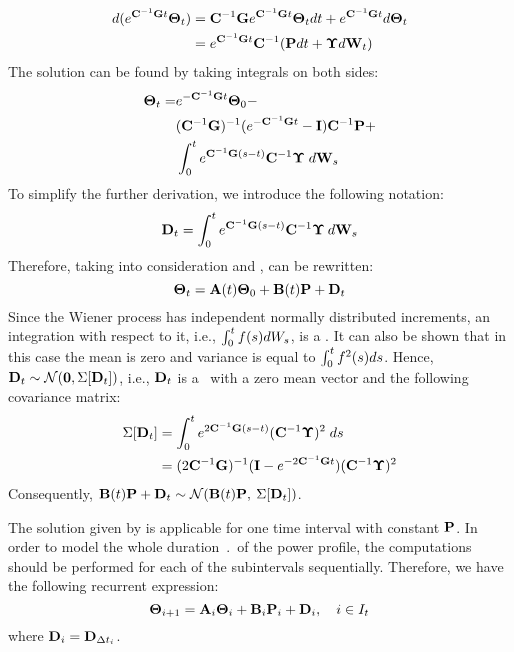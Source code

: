 \begin{align*}
  d(e^{\mathbf{C}^{-1} \mathbf{G} t} \mathbf{\Theta}_t) & = \mathbf{C}^{-1} \mathbf{G} e^{\mathbf{C}^{-1} \mathbf{G} t} \mathbf{\Theta}_t dt + e^{\mathbf{C}^{-1} \mathbf{G} t} d\mathbf{\Theta}_t \\
  & = e^{\mathbf{C}^{-1} \mathbf{G} t} \mathbf{C}^{-1} (\mathbf{P} dt + \mathbf{\Upsilon} d\mathbf{W}_t)
\end{align*}
The solution can be found by taking integrals on both sides:
\begin{align} \equlabel{solution-full}
  \vtemperature_\time = & \emcgt{} \vtemperature_0 - \\
    & (\cg)^{-1}(\emcgt{} - \mone) \mcapacitance^{-1} \vpower + \nonumber \\
    & \int_0^\time \ecg{}{(s - \time)} \mcapacitance^{-1} \mnoisedeviation \; d\m{W}_s \nonumber
\end{align}
To simplify the further derivation, we introduce the following notation:
\[
  \mathbf{D}_t = \int_0^{t} e^{ \mathbf{C}^{-1} \mathbf{G} (s - t)} \mathbf{C}^{-1} \mathbf{\Upsilon} \: d\mathbf{W}_s
\]
Therefore, taking into consideration  and ,  can be rewritten:
\[
  \mathbf{\Theta}_t = \mathbf{A}(t) \mathbf{\Theta}_0 + \mathbf{B}(t) \mathbf{P} + \mathbf{D}_t
\]
Since the Wiener process has independent normally distributed increments, an integration with respect to it, i.e., $\int_0^t f(s) dW_s$, is a \nrv. It can also be shown that in this case the mean is zero and variance is equal to $\int_0^t f^2(s) ds$. Hence, $\mathbf{D}_t \sim \mathcal{N}(\mathbf{0}, \Sigma[\mathbf{D}_t])$, i.e., $\mathbf{D}_t$ is a \mnrv\ with a zero mean vector and the following covariance matrix:
\begin{align}
  \covariance{\v{D}_\time} & = \int_0^\time \ecg{2}{(s - \time)} (\mcapacitance^{-1} \mnoisedeviation)^2 \; ds \nonumber \\
  & = (2 \cg)^{-1} (\mone - \emcgt{2}) (\mcapacitance^{-1} \mnoisedeviation)^2 \equlabel{covariance-d}
\end{align}
Consequently, $\mathbf{B}(t) \mathbf{P} + \mathbf{D}_t \sim \mathcal{N}(\mathbf{B}(t) \mathbf{P}, \: \Sigma[\mathbf{D}_t])$.

The solution given by  is applicable for one time interval with constant $\mathbf{P}$. In order to model the whole duration $\period$ of the power profile, the computations should be performed for each of the subintervals sequentially. Therefore, we have the following recurrent expression:
\begin{equation} \equlabel{tta-fourier-recurrence-noise}
  \vtemperature_{i + 1} = \m{A}_i \vtemperature_i + \m{B}_i \vpower_i + \m{D}_i, \sep i \in \timeindex
\end{equation}
where $\mathbf{D}_i = \mathbf{D}_{\Delta t_i}$.

